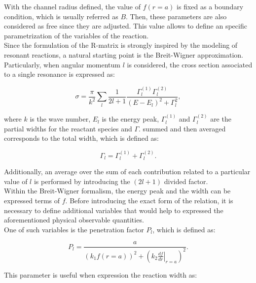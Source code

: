 \documentclass[openany]{book}
\begin{document}
With the channel radius defined, the value of $f(r = a)$ is fixed as a boundary condition, which is usually referred as $B$.  Then, these parameters are also considered as free since they are adjusted. This value allows to define an specific parametrization of the variables of the reaction. \\

Since the formulation of the R-matrix is strongly inspired by the modeling of resonant reactions, a natural starting point is the Breit-Wigner approximation. Particularly, when angular momentum $l$ is considered, the cross section associated to a single resonance is expressed as:

\begin{equation}  \label{eq:rmatrix_breitWigner}
	\sigma = \frac{\pi}{k^2} \sum_{l} \frac{1}{2l + 1} \frac{\Gamma^{(1)}_{l} \Gamma^{(2)}_{l} }{(E - E_l)^2  + \Gamma^2_l }, 
\end{equation}

where $k$ is the wave number, $E_l$ is the energy peak,  $\Gamma^{(1)}_{l}$ and $\Gamma^{(2)}_{l}$ are the partial widths for the reactant species and $\Gamma$. summed and then averaged corresponds to the total width, which is defined as: 

\begin{equation}  \label{eq:rmatrix_totalWidth}
	\Gamma_l = \Gamma^{(1)}_{l} + \Gamma^{(2)}_{l}. 
\end{equation}

Additionally, an average over the sum of each contribution related to a particular value of $l$ is performed by introducing the $(2l +1)$ divided factor. \\

Within the Breit-Wigner formalism, the energy peak and the width can be expressed terms of $f$. Before introducing the exact form of the relation, it is necessary to define additional variables that would help to expressed the aforementioned physical observable quantities.  \\

One of such variables is the penetration factor $P_l$, which is defined as: 

\begin{equation}  \label{eq:rmatrix_penetrationFactor}
	P_l = \frac{a}{(k_1 f(r = a ))^2 + \left(k_2 \left.\frac{df}{dr}\right|_{r = a} \right)^2 }.
\end{equation}

This parameter is useful when expression the reaction width as: 
\end{document}
